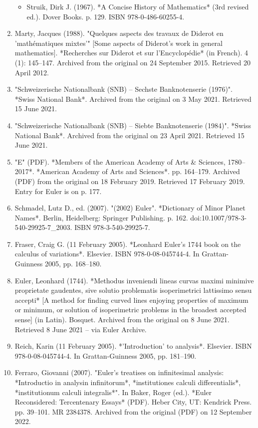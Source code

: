 \begin{enumerate}
\begin{itemize}
\item Struik, Dirk J. (1967). *A Concise History of Mathematics* (3rd revised ed.). Dover Books. p. 129. ISBN 978-0-486-60255-4.
\end{itemize}
\item Marty, Jacques (1988). "Quelques aspects des travaux de Diderot en 'mathématiques mixtes'" [Some aspects of Diderot's work in general mathematics]. *Recherches sur Diderot et sur l'Encyclopédie* (in French). 4 (1): 145–147. Archived from the original on 24 September 2015. Retrieved 20 April 2012.
\item "Schweizerische Nationalbank (SNB) – Sechste Banknotenserie (1976)". *Swiss National Bank*. Archived from the original on 3 May 2021. Retrieved 15 June 2021.
\item "Schweizerische Nationalbank (SNB) – Siebte Banknotenserie (1984)". *Swiss National Bank*. Archived from the original on 23 April 2021. Retrieved 15 June 2021.
\item "E" (PDF). *Members of the American Academy of Arts & Sciences, 1780–2017*. *American Academy of Arts and Sciences*. pp. 164–179. Archived (PDF) from the original on 18 February 2019. Retrieved 17 February 2019. Entry for Euler is on p. 177.
\item Schmadel, Lutz D., ed. (2007). "(2002) Euler". *Dictionary of Minor Planet Names*. Berlin, Heidelberg: Springer Publishing. p. 162. doi:10.1007/978-3-540-29925-7_2003. ISBN 978-3-540-29925-7.
\item Fraser, Craig G. (11 February 2005). *Leonhard Euler's 1744 book on the calculus of variations*. Elsevier. ISBN 978-0-08-045744-4. In Grattan-Guinness 2005, pp. 168–180.
\item Euler, Leonhard (1744). *Methodus inveniendi lineas curvas maximi minimive proprietate gaudentes, sive solutio problematis isoperimetrici lattissimo sensu accepti* [A method for finding curved lines enjoying properties of maximum or minimum, or solution of isoperimetric problems in the broadest accepted sense] (in Latin). Bosquet. Archived from the original on 8 June 2021. Retrieved 8 June 2021 – via Euler Archive.
\item Reich, Karin (11 February 2005). *'Introduction' to analysis*. Elsevier. ISBN 978-0-08-045744-4. In Grattan-Guinness 2005, pp. 181–190.
\item Ferraro, Giovanni (2007). "Euler's treatises on infinitesimal analysis: *Introductio in analysin infinitorum*, *institutiones calculi differentialis*, *institutionum calculi integralis*". In Baker, Roger (ed.). *Euler Reconsidered: Tercentenary Essays* (PDF). Heber City, UT: Kendrick Press. pp. 39–101. MR 2384378. Archived from the original (PDF) on 12 September 2022.

\end{enumerate}
